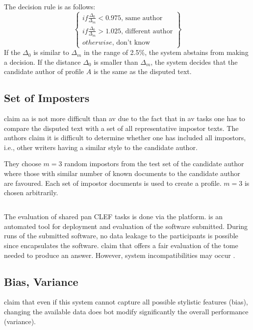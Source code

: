 The decision rule is as follows:
$$\left\{ \begin{matrix}
if \frac{\Delta_0}{\Delta_m} < 0.975 \text{, same author} \\
if \frac{\Delta_0}{\Delta_m} > 1.025 \text{, different author}\\
otherwise \text{, don't know}
\end{matrix}\right\}$$
If the $\Delta_0$ is similar to $\Delta_m$ in the range of 2.5\%, the system abstains from making a decision.
If the distance $\Delta_0$ is smaller than $\Delta_m$, the system decides that the candidate author of profile $A$ is the same as the disputed text.

\subsection{Set of Imposters}

\citet{kocher_unine_2015} claim \ac{aa} is not more difficult than \ac{av} 
due to the fact that in \ac{av} tasks one has to compare the disputed text with a set of all representative impostor texts.
The authors claim it is difficult to determine whether one has included all impostors, 
i.e., other writers having a similar style to the candidate author.

They choose $m=3$ random impostors from the test set of the candidate author 
where those with similar number of known documents to the candidate author are favoured.
Each set of impostor documents is used to create a profile.
$m=3$ is chosen arbitrarily.

\subsection{\tira{}}
\label{sec:tira}

The evaluation of shared \ac{pan} CLEF tasks is done via the \tira{} platform.
\tira{} is an automated tool for deployment and evaluation of the software submitted.
During runs of the submitted software, no data leakage to the participants is possible since \tira{} encapsulates the software.
\citet{kocher_unine_2015} claim that \tira{} offers a fair evaluation of the tome needed to produce an answer.
However, system incompatibilities may occur \citep{kocher_unine_2015}.

\subsection{Bias, Variance}
\citet{kocher_unine_2015} claim that even if this system cannot capture all possible stylistic features (bias), 
changing the available data does bot modify significantly the overall performance (variance).
